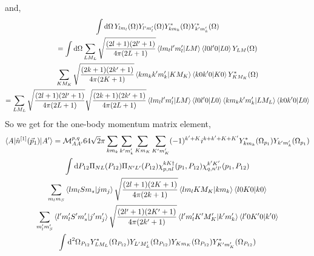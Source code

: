 \documentclass[10pt]{article}
\begin{document}
and,
\begin{multline*}
	\int \text{d} \Omega \, Y_{ l m_l }(\Omega) Y_{ l' m_l'}(\Omega) Y_{ k m_k}^{*}(\Omega) Y_{ k' m_k'}^{*}(\Omega) \\
	= \int \text{d} \Omega \sum_{LM_L} \sqrt{ \frac{(2l+1)(2l'+1)}{4 \pi (2L+1)}} \braket{ l m_l l' m_l' | L M} \braket{ l 0 l' 0 | L 0 } Y_{L M}(\Omega) \\
	 \sum_{K M_K} \sqrt{ \frac{(2k+1)(2k'+1)}{4 \pi (2K+1)}} \braket{ k m_k k' m_k' | K M_K} \braket{ k 0 k' 0 | K 0 } Y_{K M_K}^{*}(\Omega) \\
	 = \sum_{LM_L} \sqrt{ \frac{(2l+1)(2l'+1)}{4 \pi (2L+1)}} \sqrt{ \frac{(2k+1)(2k'+1)}{4 \pi (2L+1)}} \braket{ l m_l l' m_l' | L M} \braket{ l 0 l' 0 | L 0 } \braket{ k m_k k' m_k' | L M_L} \braket{ k 0 k' 0 | L 0 } 
\end{multline*}
So we get for the one-body momentum matrix element,
\begin{multline*}
\braket{ A | \hat{n}^{[1]}(\vec{p}_1) | A'} = \mathcal{M}_{A A'}^{p,q} 64 \sqrt{2} \pi \sum_{k m_k} \sum_{k' m_k'} \sum_{K m_K} \sum_{K' m_K'} (-1)^{k'+K} i^{k+k'+K+K'} Y_{k m_k}^{*}(\Omega_{p_1}) Y_{k' m_k'}(\Omega_{p_1}) \\
 \int \text{d} P_{12} \Pi_{N L}(P_{12}) \Pi_{N' L'}(P_{12}) \chi_{p,nl}^{kK\dagger}(p_1,P_{12}) \chi_{q,n'l'}^{k'K'}(p_1,P_{12}) \\
 \sum_{m_l m_S} \braket{l m_l S m_s | j m_j} \sqrt{ \frac{ (2l+1)(2K+1)}{ 4 \pi (2k+1)} } \braket{ l m_l K M_K | k m_k } \braket{ l 0 K 0 | k 0}  \\
  \sum_{m_l' m_S'} \braket{l' m_l' S' m_s' | j' m_j'} \sqrt{ \frac{ (2l'+1)(2K'+1)}{ 4 \pi (2k'+1)} } \braket{ l' m_l' K' M_K' | k' m_k' } \braket{ l' 0 K' 0 | k' 0}  \\
   \int \text{d}^{2} \Omega_{P_{12}}  Y_{L M_L}^{*}(\Omega_{P_{12}})  Y_{L' M_L'}(\Omega_{P_{12}}) Y_{K m_K}(\Omega_{P_{12}}) Y_{K' m_K'}^{*}(\Omega_{P_{12}}) \\
\end{multline*}
\end{document}

